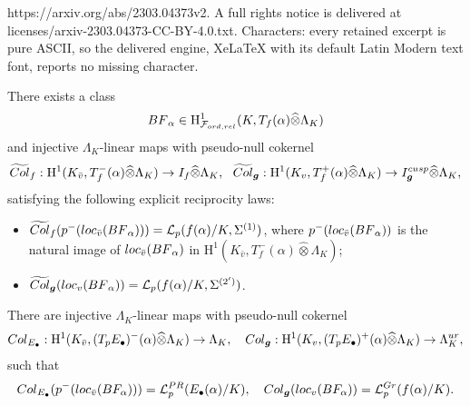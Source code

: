\documentclass[10pt,a4paper]{amsart}
\newcommand{\Fcal}{\mathcal{F}}
\newcommand{\Lcal}{\mathcal{L}}
\newcommand{\bg}{\boldsymbol{g}}
\newcommand{\rH}{\mathrm{H}}
\begin{document}
https://arxiv.org/abs/2303.04373v2. A full rights notice is delivered at licenses/arxiv-2303.04373-CC-BY-4.0.txt. Characters: every retained excerpt is pure ASCII, so the delivered engine, XeLaTeX with its default Latin Modern text font, reports no missing character.
\begin{thm}%
\label{thm:KLZ}
There exists a class
\[
{BF}_\alpha\in\rH^1_{\Fcal_{\rm ord,\rm rel}}(K,T_f(\alpha)\widehat\otimes\Lambda_K)
\]
and injective $\Lambda_K$-linear maps with pseudo-null cokernel
\begin{align*}
\widetilde{\rm Col}_{f}:\rH^1(K_{\bar{v}},T_f^-(\alpha)\widehat\otimes\Lambda_K) \to I_f\widehat\otimes\Lambda_K, \ \ 
\widetilde{\rm Col}_{\boldsymbol{g}}:\rH^1(K_{v},T_f^+(\alpha)\widehat\otimes\Lambda_K) \to I_{\bg}^{\rm cusp}\widehat\otimes\Lambda_K,
\end{align*}
satisfying the following explicit reciprocity laws:
\begin{itemize}
\item[(a)] 
$\widetilde{\rm Col}_f(p^-({\rm loc}_{\bar v}({BF}_\alpha)))=\Lcal_p(f(\alpha)/K,\Sigma^{(1)})$, where $p^-({\rm loc}_{\bar{v}}({BF}_\alpha))$ is the natural image of ${\rm loc}_{\bar{v}}({BF}_\alpha)$ in $\rH^1(K_{\bar{v}},T_f^-(\alpha)\widehat\otimes\Lambda_K)$;
\item[(b)] $\widetilde{\rm Col}_{\boldsymbol{g}}({\rm loc}_{v}({BF}_\alpha))=\Lcal_p(f(\alpha)/K,\Sigma^{(2')})$.
\end{itemize}
\end{thm}

\begin{cor}\label{cor:KLZ}
There are injective $\Lambda_K$-linear maps with pseudo-null cokernel 
\[
{\rm Col}_{E_\bullet}:\rH^1(K_{\bar{v}},(T_pE_\bullet)^-(\alpha)\widehat\otimes\Lambda_K)\to\Lambda_K,\quad
{\rm Col}_{\boldsymbol{g}}:\rH^1(K_{v},(T_pE_\bullet)^+(\alpha)\widehat\otimes\Lambda_K)\to\Lambda_K^{\rm ur},
\]
such that 
\[
{\rm Col}_{E_\bullet}(p^-({\rm loc}_{\bar v}(BF_{\alpha})))=\Lcal_p^{\rm PR}(E_\bullet(\alpha)/K),\quad{\rm Col}_{\boldsymbol{g}}({\rm loc}_{v}(BF_{\alpha}))=\Lcal_p^{\rm Gr}(f(\alpha)/K).
\]
\end{cor}
\end{document}
